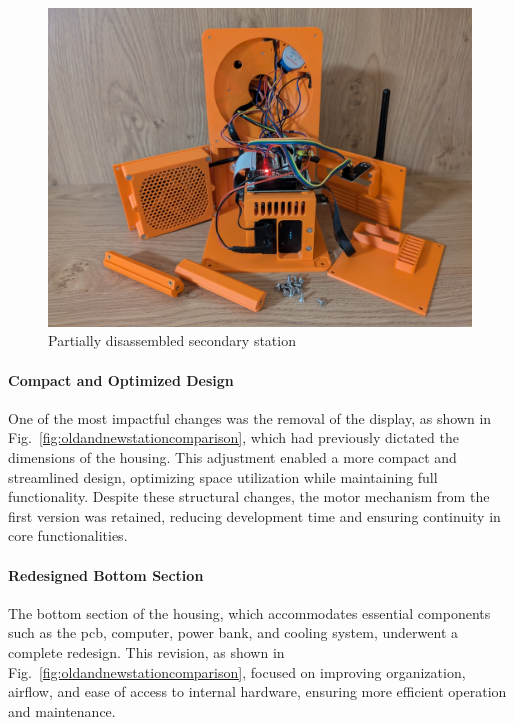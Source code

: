 \begin{figure}[H]
	\centering
	\includegraphics[width=1.0\linewidth]{figures/open_station}
	\caption{Partially disassembled secondary station}
	\label{fig:openstation}
\end{figure}


\paragraph{Compact and Optimized Design}
One of the most impactful changes was the removal of the display, as shown in Fig.~\ref{fig:oldandnewstationcomparison}, which had previously dictated the dimensions of the housing. This adjustment enabled a more compact and streamlined design, optimizing space utilization while maintaining full functionality. Despite these structural changes, the motor mechanism from the first version was retained, reducing development time and ensuring continuity in core functionalities.  

\paragraph{Redesigned Bottom Section}  
The bottom section of the housing, which accommodates essential components such as the \acrshort{pcb}, computer, power bank, and cooling system, underwent a complete redesign. This revision, as shown in Fig.~\ref{fig:oldandnewstationcomparison}, focused on improving organization, airflow, and ease of access to internal hardware, ensuring more efficient operation and maintenance.  

